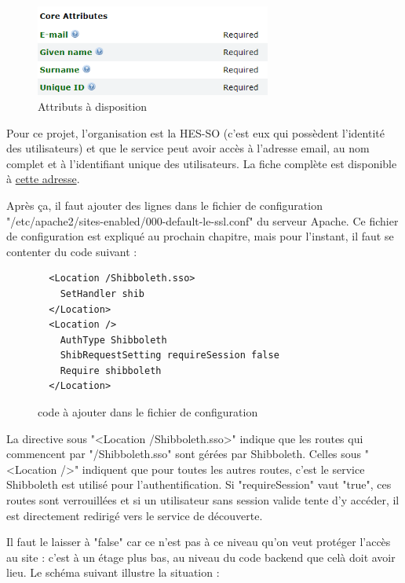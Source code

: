 \documentclass[
    iai, %
    eai, %
]{heig-tb}
\begin{document}
\begin{figure}[h]
  \centering
  \includegraphics[height=3cm]{registry2.PNG}
  \caption{Attributs à disposition}
\end{figure}

Pour ce projet, l'organisation est la HES-SO (c'est eux qui possèdent l'identité des utilisateurs) et que le service peut avoir accès à l'adresse email, au nom complet et à l'identifiant unique des utilisateurs. La fiche complète est disponible à \href{https://rr.aai.switch.ch/view_resource.php?resource=11600}{cette adresse}.

Après ça, il faut ajouter des lignes dans le fichier de configuration "/etc/apache2/sites-enabled/000-default-le-ssl.conf" du serveur Apache. Ce fichier de configuration est expliqué au prochain chapitre, mais pour l'instant, il faut se contenter du code suivant :

\begin{figure}[h]
  \begin{verbatim}
  <Location /Shibboleth.sso>
    SetHandler shib
  </Location>
  <Location />
    AuthType Shibboleth
    ShibRequestSetting requireSession false
    Require shibboleth
  </Location>
  \end{verbatim}
  \caption{code à ajouter dans le fichier de configuration}
  \label{code:Location}
\end{figure}

\newpage
La directive sous "<Location /Shibboleth.sso>" indique que les routes qui commencent par "/Shibboleth.sso" sont gérées par Shibboleth.
Celles sous "<Location />" indiquent que pour toutes les autres routes, c'est le service Shibboleth est utilisé pour l'authentification. Si "requireSession" vaut "true", ces routes sont verrouillées et si un utilisateur sans session valide tente d'y accéder, il est directement redirigé vers le service de découverte.

Il faut le laisser à "false" car ce n'est pas à ce niveau qu'on veut protéger l'accès au site : c'est à un étage plus bas, au niveau du code backend que celà doit avoir lieu.
Le schéma suivant illustre la situation :

\end{document}
